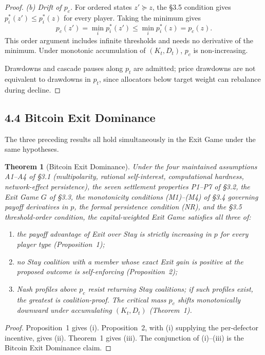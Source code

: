 \documentclass[12pt]{article}
\newtheorem{theorem}{Theorem}
\theoremstyle{definition}
\theoremstyle{remark}
\begin{document}
\begin{proof}
\emph{(b) Drift of $p_c$.} For ordered states $z'\succeq z$, the \S3.5 condition gives $p_i^*(z')\le p_i^*(z)$ for every player. Taking the minimum gives
\[
 p_c(z')=\min_i p_i^*(z')\le\min_i p_i^*(z)=p_c(z).
\]
This order argument includes infinite thresholds and needs no derivative of the minimum. Under monotonic accumulation of $(K_t,D_t)$, $p_c$ is non-increasing.

Drawdowns and cascade pauses along $p_t$ are admitted; price drawdowns are not equivalent to drawdowns in $p_t$, since allocators below target weight can rebalance during decline.
\end{proof}

\subsection{4.4 Bitcoin Exit Dominance}

The three preceding results all hold simultaneously in the Exit Game under the same hypotheses.

\begin{theorem}[Bitcoin Exit Dominance]
Under the four maintained assumptions A1--A4 of \S3.1 (multipolarity,
rational self-interest, computational hardness, network-effect
persistence), the seven settlement properties P1--P7 of \S3.2, the
Exit Game $G$ of \S3.3, the monotonicity conditions (M1)--(M4) of
\S3.4 governing payoff derivatives in $p$, the formal persistence condition (NR), and the \S3.5 threshold-order
condition, the capital-weighted Exit Game satisfies all three of:
\begin{enumerate}[label=(\roman*),nosep]
\item the payoff advantage of Exit over Stay is strictly increasing
in $p$ for every player type (Proposition~1);
\item no Stay coalition with a member whose exact Exit gain is positive at the proposed outcome is self-enforcing (Proposition~2);
\item Nash profiles above $p_c$ resist returning Stay coalitions; if such profiles exist, the greatest is coalition-proof. The critical mass $p_c$ shifts monotonically downward under accumulating $(K_t,D_t)$ (Theorem~1).
\end{enumerate}
\end{theorem}

\begin{proof}
Proposition~1 gives (i). Proposition~2, with (i) supplying the
per-defector incentive, gives (ii). Theorem~1 gives (iii). The
conjunction of (i)--(iii) is the Bitcoin Exit Dominance claim.
\end{proof}
\end{document}
